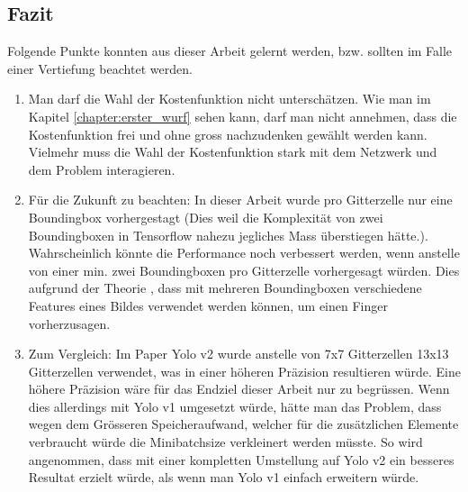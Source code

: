 \subsection{Fazit}
Folgende Punkte konnten aus dieser Arbeit gelernt werden, bzw. sollten im Falle einer Vertiefung beachtet werden. 
\begin{enumerate}
\item Man darf die Wahl der Kostenfunktion nicht unterschätzen. 
Wie man im Kapitel \ref{chapter:erster_wurf} sehen kann, darf man nicht annehmen, dass die Kostenfunktion frei und ohne gross nachzudenken gewählt werden kann. 
Vielmehr muss die Wahl der Kostenfunktion stark mit dem Netzwerk und dem Problem interagieren. 
\item Für die Zukunft zu beachten: In dieser Arbeit wurde pro Gitterzelle nur eine Boundingbox vorhergestagt (Dies weil die Komplexität von zwei Boundingboxen in Tensorflow nahezu jegliches Mass überstiegen hätte.). Wahrscheinlich könnte die Performance noch verbessert werden, wenn anstelle von einer min. zwei Boundingboxen pro Gitterzelle vorhergesagt würden. Dies aufgrund der Theorie \cite{PrivateCommunication}, dass mit mehreren Boundingboxen verschiedene Features eines Bildes verwendet werden können, um einen Finger vorherzusagen.
\item Zum Vergleich: Im Paper Yolo v2 wurde anstelle von 7x7 Gitterzellen 13x13 Gitterzellen verwendet, was in einer höheren Präzision resultieren würde. 
Eine höhere Präzision wäre für das Endziel dieser Arbeit nur zu begrüssen. 
Wenn dies allerdings mit Yolo v1 umgesetzt würde, hätte man das Problem, dass wegen dem Grösseren Speicheraufwand, welcher für die zusätzlichen Elemente \grqq{}verbraucht\grqq{} würde die Minibatchsize verkleinert werden müsste. 
So wird angenommen, dass mit einer kompletten Umstellung auf Yolo v2 ein besseres Resultat erzielt würde, als wenn man Yolo v1 einfach erweitern würde. 
\end{enumerate}
